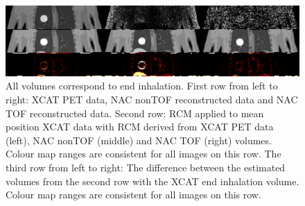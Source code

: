 \documentclass[portrait,color=UCLburgundy,margin=2cm]{uclposter}
\begin{document}
\begin{figure}[b]
    \centering
    \includegraphics[width=1\linewidth]{output_flipped.png}
    \caption{All volumes correspond to end inhalation. First row from left to right: XCAT PET data, NAC nonTOF reconstructed data and NAC TOF reconstructed data. Second row: RCM applied to mean position XCAT data with RCM derived from XCAT PET data (left), NAC nonTOF (middle) and NAC TOF (right) volumes. Colour map ranges are consistent for all images on this row. The third row from left to right: The difference between the estimated volumes from the second row with the XCAT end inhalation volume. Colour map ranges are consistent for all images on this row.}
    \label{fig:output}
\end{figure}
\end{document}
